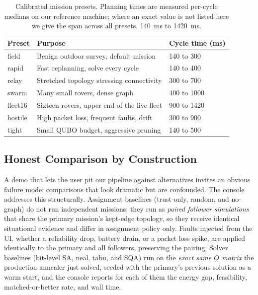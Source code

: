 \begin{table}[t]
\centering
\caption{Calibrated mission presets. Planning times are measured per-cycle
medians on our reference machine; where an exact value is not listed here
we give the span across all presets, 140~ms to 1420~ms.}
\label{tab:presets}
\begin{tabular}{@{}lll@{}}
\toprule
Preset & Purpose & Cycle time (ms) \\
\midrule
field   & Benign outdoor survey, default mission            & 140 to 300 \\
rapid   & Fast replanning, solve every cycle                & 140 to 400 \\
relay   & Stretched topology stressing connectivity         & 300 to 700 \\
swarm   & Many small rovers, dense graph                    & 400 to 1000 \\
fleet16 & Sixteen rovers, upper end of the live fleet       & 900 to 1420 \\
hostile & High packet loss, frequent faults, drift          & 300 to 900 \\
tight   & Small QUBO budget, aggressive pruning             & 140 to 500 \\
\bottomrule
\end{tabular}
\end{table}

\subsection{Honest Comparison by Construction}

A demo that lets the user pit our pipeline against alternatives invites an
obvious failure mode: comparisons that look dramatic but are confounded.
The console addresses this structurally. Assignment baselines
(trust-only, random, and no-graph) do not run independent missions; they
run as \emph{paired follower simulations} that share the primary mission's
kept-edge topology, so they receive identical situational evidence and
differ in assignment policy only. Faults injected from the UI, whether a
reliability drop, battery drain, or a packet loss spike, are applied
identically to the primary and all followers, preserving the pairing.
Solver baselines (bit-level SA, neal, tabu, and SQA) run on the
\emph{exact same $Q$ matrix} the production annealer just solved, seeded
with the primary's previous solution as a warm start, and the console
reports for each of them the energy gap, feasibility, matched-or-better
rate, and wall time.


